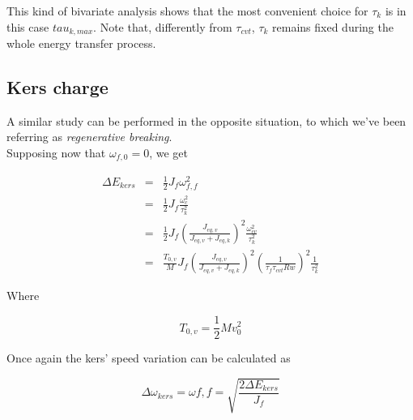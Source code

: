 \documentclass[11pt]{article}
\begin{document}
This kind of bivariate analysis shows that the most convenient choice for $\tau_k$ is in this case $tau_{k,max}$. Note that, differently from $\tau_{cvt}$, $\tau_k$ remains fixed during the whole energy transfer process.

\subsection{Kers charge}

A similar study can be performed in the opposite situation, to which we've been referring as \textit{regenerative breaking}.\\Supposing now that $\omega_{f,0}=0$, we get

\begin{eqnarray}
\Delta E_{kers}&=&\frac{1}{2}J_f\omega_{f,f}^2\\
               &=&\frac{1}{2}J_f\frac{\omega_{c}^2}{\tau_k^2}\\
               &=&\frac{1}{2}J_f\left(\frac{J_{eq,v}}{J_{eq,v}+J_{eq,k}}					          \right)^2\frac{\omega_{cv}^2}{\tau_k^2}\\               
               &=&\frac{T_{0,v}}{M}J_f\left(\frac{J_{eq,v}}{J_{eq,v}+J_{eq,k}}					     \right)^2\left(\frac{1}{\tau_f \tau_{cvt}Rw}\right)^2\frac{1}    						 {\tau_k^2} 
\end{eqnarray}

Where

\begin{equation}
T_{0,v} = \frac{1}{2}Mv_0^2
\end{equation} 

Once again the kers' speed variation can be calculated as 


\begin{equation}
\Delta \omega_{kers} = \omega f,f = \sqrt{\frac{2\Delta E_{kers}}{J_f}}
\end{equation}
\end{document}
